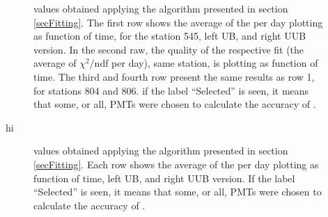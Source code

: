 \documentclass[twoside, final, 10pt]{articleMine}
\begin{document}
\begin{figure}[!b]
  \centering
  \caption{\qpkvem values obtained applying the algorithm
  presented in section \ref{secFitting}. The first row shows the
  average of the \qpkvem per day plotting as function of time,
  for the station  545, left UB, and right UUB version. In the
  second raw, the quality of the respective fit (the average of
  $\chi^2/$ndf per day), same station, is plotting as function of
  time. The third and fourth row present the same results as row
  1, for stations 804 and 806. if the label ``Selected'' is seen,
  it means that some, or all, PMTs were chosen to calculate the
  accuracy of \qpkvem.}
\end{figure}
\clearpage

hi
\begin{figure}[!b]
  \centering
  \caption{\qpkvem values obtained applying the algorithm
  presented in section \ref{secFitting}. Each row shows the
  average of the \qpkvem per day plotting as function of time,
  left UB, and right UUB version. If the label ``Selected'' is
  seen, it means that some, or all, PMTs were chosen to calculate
  the accuracy of \qpkvem.}
\end{figure}
\clearpage
\end{document}

